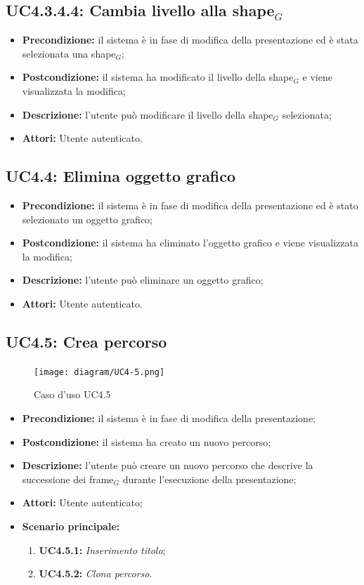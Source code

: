 \subsection{ UC4.3.4.4: Cambia livello alla shape$_G$}

\begin{itemize}
	\item \textbf{Precondizione:} il sistema è in fase di modifica della presentazione ed è stata selezionata una shape$_G$;
	\item \textbf{Postcondizione:} il sistema ha modificato il livello della shape$_G$ e viene visualizzata la modifica;
	\item \textbf{Descrizione:} l'utente può modificare il livello della shape$_G$ selezionata;
	\item \textbf{Attori:} Utente autenticato.
\end{itemize}
\subsection{ UC4.4: Elimina oggetto grafico}

\begin{itemize}
	\item \textbf{Precondizione:} il sistema è in fase di modifica della presentazione ed è stato selezionato un oggetto grafico;
	\item \textbf{Postcondizione:} il sistema ha eliminato l'oggetto grafico e viene visualizzata la modifica;
	\item \textbf{Descrizione:} l'utente può eliminare un oggetto grafico;
	\item \textbf{Attori:} Utente autenticato.
\end{itemize}
\subsection{ UC4.5: Crea percorso}

\begin{figure}[h]
	\begin{center}
	\texttt{[image: diagram/UC4-5.png]}
	\caption{Caso d'uso UC4.5}
	\end{center}
\end{figure}
\begin{itemize}
	\item \textbf{Precondizione:} il sistema è in fase di modifica della presentazione;
	\item \textbf{Postcondizione:} il sistema ha creato un nuovo percorso;
	\item \textbf{Descrizione:} l'utente può creare un nuovo percorso che descrive la successione dei frame$_G$ durante l'esecuzione della presentazione;
	\item \textbf{Attori:} Utente autenticato;
	\item \textbf{Scenario principale:}
	\begin{enumerate}
		\item \textbf{ UC4.5.1:} \textit{ Inserimento titolo};
		\item \textbf{ UC4.5.2:} \textit{ Clona percorso}.
	\end{enumerate}
\end{itemize}

